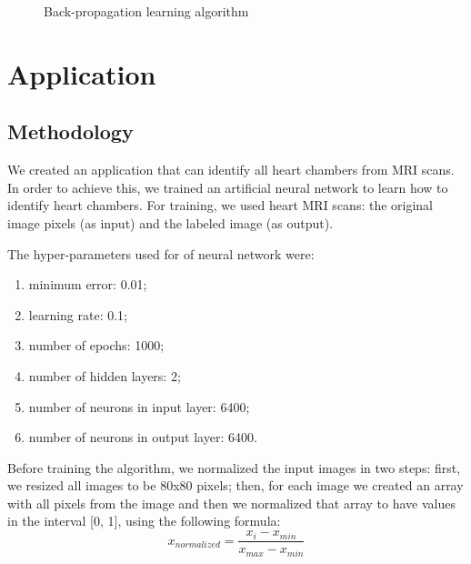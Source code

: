 \documentclass[12pt]{report}
\begin{document}
 \begin{figure}[h]
 	\centering
 	\caption{Back-propagation learning algorithm}
 	\label{fig:back-propagation}
 \end{figure}

\chapter{Application}
\section{Methodology}
We created an application that can identify all heart chambers from MRI scans. In order to achieve this, we trained an artificial neural network to learn how to identify heart chambers. For training, we used heart MRI scans: the original image pixels (as input) and the labeled image (as output).

The hyper-parameters used for of neural network were: 
\begin{enumerate}
	\item minimum error: 0.01;
	\item learning rate: 0.1;
	\item number of epochs: 1000;
	\item number of hidden layers: 2;
	\item number of neurons in input layer: 6400;
	\item number of neurons in output layer: 6400.
\end{enumerate}  

Before training the algorithm, we normalized the input images in two steps: first, we resized all images to be 80x80 pixels; then, for each image we created an array with all pixels from the image and then we normalized that array to have values in the interval [0, 1], using the following formula: 
\begin{equation}
x_{normalized}=\frac{x_{i} - x_{min}}{x_{max} - x_{min}}
\end{equation}
\end{document}
